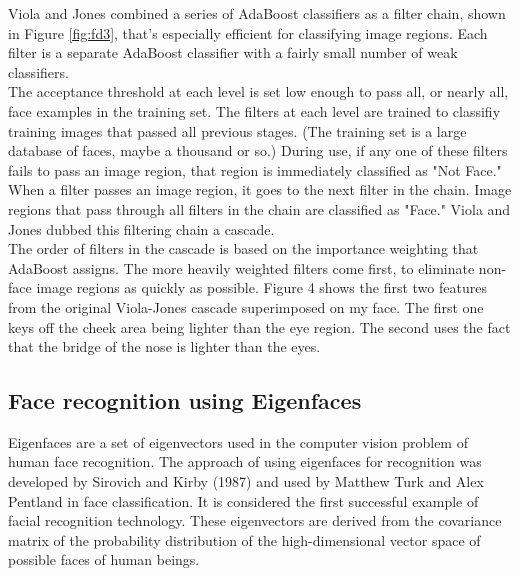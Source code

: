 \documentclass[12pt]{article}			%
\begin{document}
Viola and Jones combined a series of AdaBoost classifiers as a filter chain, shown in Figure \ref{fig:fd3}, that's especially efficient for classifying image regions. Each filter is a separate AdaBoost classifier with a fairly small number of weak classifiers.\\
The acceptance threshold at each level is set low enough to pass all, or nearly all, face examples in the training set. The filters at each level are trained to classifiy training images that passed all previous stages. (The training set is a large database of faces, maybe a thousand or so.) During use, if any one of these filters fails to pass an image region, that region is immediately classified as "Not Face." When a filter passes an image region, it goes to the next filter in the chain. Image regions that pass through all filters in the chain are classified as "Face." Viola and Jones dubbed this filtering chain a cascade.\\
The order of filters in the cascade is based on the importance weighting that AdaBoost assigns. The more heavily weighted filters come first, to eliminate non-face image regions as quickly as possible. Figure 4 shows the first two features from the original Viola-Jones cascade superimposed on my face. The first one keys off the cheek area being lighter than the eye region. The second uses the fact that the bridge of the nose is lighter than the eyes.


\subsection{ Face recognition using Eigenfaces }
Eigenfaces are a set of eigenvectors used in the computer vision problem of human face recognition. The approach of using eigenfaces for recognition was developed by Sirovich and Kirby (1987) and used by Matthew Turk and Alex Pentland in face classification\cite{Turk91}. It is considered the first successful example of facial recognition technology. These eigenvectors are derived from the covariance matrix of the probability distribution of the high-dimensional vector space of possible faces of human beings.\\
\end{document}
